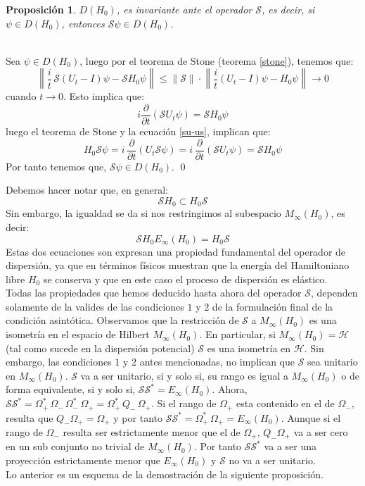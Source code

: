 \documentclass[12pt]{book}
\numberwithin{equation}{chapter}
\newtheorem{proposition}[theorem]{Proposici\'on}
\def\n{\noindent}
\def\S{\mathcal{S}}
\def\rar{\rightarrow}
\def\H{\mathcal{H}}
\def\O{\Omega}
\begin{document}
\begin{proposition}
$D(H_{0})$, es invariante ante el operador $\S$, es decir, si $\psi \in D(H_{0})$, entonces $\S \psi \in D(H_{0})$. 
\end{proposition}
\n {\bf Demostraci\'on}\\
Sea $\psi \in D(H_{0})$, luego por el teorema de Stone (teorema \ref{stone}), tenemos que:
$$ \left\| \frac{i}{t} \, \S (U_{t}-I) \psi - \S H_{0} \psi  \right\| \leq \| \S \| \cdot \left\| \frac{i}{t}  (U_{t}-I) \psi -  H_{0} \psi  \right\| \rar 0 $$
cuando $t \rar 0$. Esto implica que:
$$ i \frac{\partial}{\partial t} ( \S U_{t} \psi)= \S H_{0} \psi $$
luego el teorema de Stone y la ecuaci\'on \eqref{su-us}, implican que:
$$ H_{0} \S \psi = i \, \frac{\partial}{\partial t}( U_{t}\S \psi )= i \, \frac{\partial}{\partial t}(\S U_{t} \psi )= \S H_{0} \psi  $$
Por tanto tenemos que, $ \S \psi \in D(H_{0}) $. \qed

\vspace{5 mm}

Debemos hacer notar que, en general: 
\begin{equation}
\S H_{0} \subset H_{0} \S
\end{equation}
Sin embargo, la igualdad se da si nos restringimos al subespacio $M_{\infty} (H_{0})$, es decir:
\begin{equation}
\S H_{0} E_{\infty} (H_{0})= H_{0} \S
\end{equation}
Estas dos ecuaciones son expresan una propiedad fundamental del operador de dispersi\'on, ya que en t\'erminos f\'isicos muestran que la energ\'ia del Hamiltoniano libre $H_{0}$ se conserva y que en este caso el proceso de dispersi\'on es el\'astico.\\

Todas las propiedades que hemos deducido hasta ahora del operador $\S$, dependen solamente de la valides de las condiciones $1$ y $2$ de la formulaci\'on final de la condici\'on asint\'otica. Observamos que la restricci\'on de $\S$ a $M_{\infty}(H_{0})$ es una isometr\'ia en el espacio de Hilbert $M_{\infty}(H_{0})$. En particular, si $M_{\infty}(H_{0})= \H $ (tal como sucede en la dispersi\'on potencial) $\S$ es una isometr\'ia en $\H$. Sin embargo, las condiciones $1$ y $2$ antes mencionadas, no implican que $\S$ sea unitario en $M_{\infty}(H_{0})$. $\S$ va a ser unitario, si y solo si, su rango es igual a $M_{\infty}(H_{0})$ o de forma equivalente, si y solo si, $\S \S^{*} = E_{\infty}(H_{0})$. Ahora, $\S \S^{*}=\O_{+}^{*}\, \O_{-} \, \O_{-}^{*} \, \O_{+}=\O_{+}^{*}\, Q_{-} \, \O_{+} $. Si el rango de $\O_{+}$ esta contenido en el de $\O_{-}$, resulta que $Q_{-} \O_{+}= \O_{+}$ y por tanto $\S \S^{*}= \O_{+}^{*} \, \O_{+}= E_{\infty}(H_{0}) $. Aunque si el rango de $\O_{-}$ resulta ser estrictamente menor que el de $\O_{+}$, $Q_{-} \O_{+}$ va a ser cero en un sub conjunto no trivial de $ M_{\infty}(H_{0}) $. Por tanto $\S \S^{*}$ va a ser una proyecci\'on estrictamente menor que $E_{\infty}(H_{0})$ y $\S$ no va a ser unitario.\\
Lo anterior es un esquema de la demostraci\'on de la siguiente proposici\'on.
\end{document}
